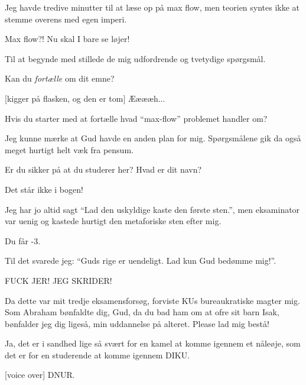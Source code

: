 \documentclass[a4paper,11pt]{article}
\begin{document}
\begin{sketch}
 Jeg havde tredive minutter til at læse op på max flow, men
teorien syntes ikke at stemme overens med egen imperi.

 Max flow?! Nu skal I bare se løjer!


 Til at begynde med stillede de mig udfordrende og tvetydige
spørgsmål.

 Kan du \emph{fortælle} om dit emne?

[kigger på flasken, og den er tom] Ææææh...

 Hvis du starter med at fortælle hvad ``max-flow'' problemet
handler om?

 Jeg kunne mærke at Gud havde en anden plan for mig. Spørgsmålene
gik da også meget hurtigt helt væk fra pensum.

 Er du sikker på at du studerer her?  Hvad er dit navn?

 Det står ikke i bogen!

 Jeg har jo altid sagt ``Lad den uskyldige kaste den første sten.'',
men eksaminator var uenig og kastede hurtigt den metaforiske sten
efter mig.

 Du får -3.

 Til det svarede jeg: ``Guds rige er uendeligt.  Lad kun Gud bedømme
mig!''.

 FUCK JER! JEG SKRIDER!

 Da dette var mit tredje eksamensforsøg, forviste KUs bureaukratiske
magter mig. Som Abraham bønfaldte dig, Gud, da du bad ham om at ofre sit barn
Isak, bønfalder jeg dig ligeså, min uddannelse på alteret. Please lad mig bestå!


 Ja, det er i sandhed lige så svært for en kamel at komme igennem et nåleøje,
         som det er for en studerende at komme igennem DIKU.

[voice over] DNUR.



\end{sketch}
\end{document}
